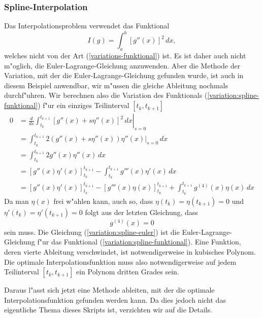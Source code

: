 \subsubsection{Spline-Interpolation}
Das Interpolationsproblem verwendet das Funktional
\begin{equation}
I(g)=
\int_a^b[g''(x)]^2\,dx,
\label{variation:spline-funktional}
\end{equation}
welches nicht von der Art (\ref{variations-funktional}) ist.
Es ist daher auch nicht m"oglich, die Euler-Lagrange-Gleichung anzuwenden.
Aber die Methode der Variation, mit der die Euler-Lagrange-Gleichung gefunden
wurde, ist auch in diesem Beispiel anwendbar, wir m"ussen die gleiche
Ableitung nochmals durchf"uhren.
Wir berechnen also die Variation
des Funktionals
(\ref{variation:spline-funktional})
f"ur ein einziges Teilinterval $[t_k,t_{k+1}]$
\begin{align*}
0&=
\left.
\frac{d}{ds}\int_{t_k}^{t_{k+1}} [g''(x)+s\eta''(x)]^2\,dx
\right|_{s=0}
\\
&=
\int_{t_k}^{t_{k+1}} 2(g''(x)+s\eta''(x))\eta''(x)\bigg|_{s=0}\,dx
\\
&=
\int_{t_k}^{t_{k+1}} 2g''(x)\eta''(x)\,dx
\\
&=
\left[g''(x)\eta'(x)\right]_{t_k}^{t_{k+1}}
-
\int_{t_k}^{t_{k+1}}
g'''(x)\eta'(x)\,dx
\\
&=
\left[g''(x)\eta'(x)\right]_{t_k}^{t_{k+1}}
-
\left[g'''(x)\eta(x)\right]_{t_k}^{t_{k+1}}
+
\int_{t_k}^{t_{k+1}} g^{(4)}(x)\eta(x)\,dx
\end{align*}
Da man $\eta(x)$ frei w"ahlen kann, auch so, dass
$\eta(t_k)=\eta(t_{k+1})=0$
und 
$\eta'(t_k)=\eta'(t_{k+1})=0$
folgt aus der letzten Gleichung, dass
\begin{equation}
g^{(4)}(x)=0
\label{variation:spline-euler}
\end{equation}
sein muss.
Die Gleichung 
(\ref{variation:spline-euler}) ist die Euler-Lagrange-Gleichung f"ur das Funktional
(\ref{variation:spline-funktional}).
Eine Funktion, deren vierte Ableitung verschwindet, ist notwendigerweise in
kubisches Polynom.
Die optimale Interpolationsfunktion muss also notwendigerweise auf jedem
Teilinterval $[t_k,t_{k+1}]$ ein Polynom dritten Grades sein.

Daraus l"asst sich jetzt eine Methode ableiten, mit der die optimale
Interpolationsfunktion gefunden werden kann.
Da dies jedoch nicht das eigentliche Thema dieses Skripts ist,
verzichten wir auf die Details.


